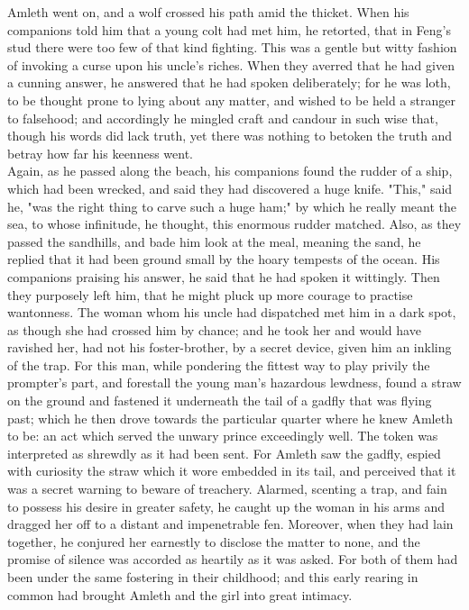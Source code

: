 \documentclass[10pt,a4paper]{report}
\begin{document}
Amleth went on, and a wolf crossed his path amid the thicket. When his companions told him that a young colt had met him, he retorted, that in Feng's stud there were too few of that kind fighting. This was a gentle but witty fashion of invoking a curse upon his uncle's riches. When they averred that he had given a cunning answer, he answered that he had spoken deliberately; for he was loth, to be thought prone to lying about any matter, and wished to be held a stranger to falsehood; and accordingly he mingled craft and candour in such wise that, though his words did lack truth, yet there was nothing to betoken the truth and betray how far his keenness went.\\

Again, as he passed along the beach, his companions found the rudder of a ship, which had been wrecked, and said they had discovered a huge knife. "This," said he, "was the right thing to carve such a huge ham;" by which he really meant the sea, to whose infinitude, he thought, this enormous rudder matched. Also, as they passed the sandhills, and bade him look at the meal, meaning the sand, he replied that it had been ground small by the hoary tempests of the ocean. His companions praising his answer, he said that he had spoken it wittingly. Then they purposely left him, that he might pluck up more courage to practise wantonness. The woman whom his uncle had dispatched met him in a dark spot, as though she had crossed him by chance; and he took her and would have ravished her, had not his foster-brother, by a secret device, given him an inkling of the trap. For this man, while pondering the fittest way to play privily the prompter's part, and forestall the young man's hazardous lewdness, found a straw on the ground and fastened it underneath the tail of a gadfly that was flying past; which he then drove towards the particular quarter where he knew Amleth to be: an act which served the unwary prince exceedingly well. The token was interpreted as shrewdly as it had been sent. For Amleth saw the gadfly, espied with curiosity the straw which it wore embedded in its tail, and perceived that it was a secret warning to beware of treachery. Alarmed, scenting a trap, and fain to possess his desire in greater safety, he caught up the woman in his arms and dragged her off to a distant and impenetrable fen. Moreover, when they had lain together, he conjured her earnestly to disclose the matter to none, and the promise of silence was accorded as heartily as it was asked. For both of them had been under the same fostering in their childhood; and this early rearing in common had brought Amleth and the girl into great intimacy.\\
\end{document}
